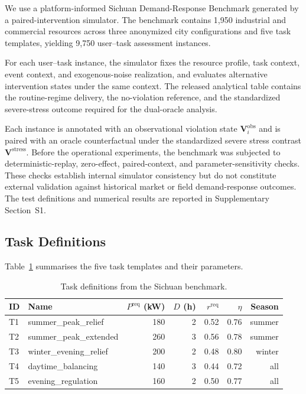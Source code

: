 \documentclass[utf8]{FrontiersinHarvard}
\newcommand{\Preq}{P^{\mathrm{req}}}
\begin{document}
We use a platform-informed Sichuan Demand-Response Benchmark
generated by a paired-intervention simulator. The benchmark
contains 1{,}950 industrial and commercial resources across
three anonymized city configurations and five task templates,
yielding 9{,}750 user--task assessment instances.

For each user--task instance, the simulator fixes the resource
profile, task context, event context, and exogenous-noise
realization, and evaluates alternative intervention states under
the same context. The released analytical table contains the
routine-regime delivery, the no-violation reference, and the
standardized severe-stress outcome required for the dual-oracle
analysis.

Each instance is annotated with an observational violation state
$\mathbf{V}_i^{\mathrm{obs}}$ and is paired with an oracle
counterfactual under the standardized severe stress contrast
$\mathbf{V}^{\mathrm{stress}}$. Before the operational experiments,
the benchmark was subjected to deterministic-replay,
zero-effect, paired-context, and parameter-sensitivity checks.
These checks establish internal simulator consistency but do
not constitute external validation against historical market or
field demand-response outcomes. The test definitions and
numerical results are reported in Supplementary Section~S1.

\subsection{Task Definitions}

Table~\ref{tab:tasks} summarises the five task templates and
their parameters.

\begin{table}[h!]
\centering
\caption{Task definitions from the Sichuan benchmark.}
\label{tab:tasks}
\begin{tabular}{llrrrrr}
\toprule
\textbf{ID} & \textbf{Name} & \textbf{$\Preq$ (kW)} &
\textbf{$D$ (h)} & \textbf{$r^{\mathrm{req}}$} &
\textbf{$\eta$} & \textbf{Season} \\
\midrule
T1 & summer\_peak\_relief & 180 & 2 & 0.52 & 0.76 & summer \\
T2 & summer\_peak\_extended & 260 & 3 & 0.56 & 0.78 & summer \\
T3 & winter\_evening\_relief & 200 & 2 & 0.48 & 0.80 & winter \\
T4 & daytime\_balancing & 140 & 3 & 0.44 & 0.72 & all \\
T5 & evening\_regulation & 160 & 2 & 0.50 & 0.77 & all \\
\bottomrule
\end{tabular}
\end{table}
\end{document}
